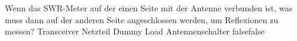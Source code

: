     {Wenn das SWR-Meter auf der einen Seite mit der Antenne verbunden ist, was muss dann auf der anderen Seite angeschlossen werden, um Reflexionen zu messen?}
    {Transceiver}
    {Netzteil}
    {Dummy Load}
    {Antennenschalter}
    {false}{false}
